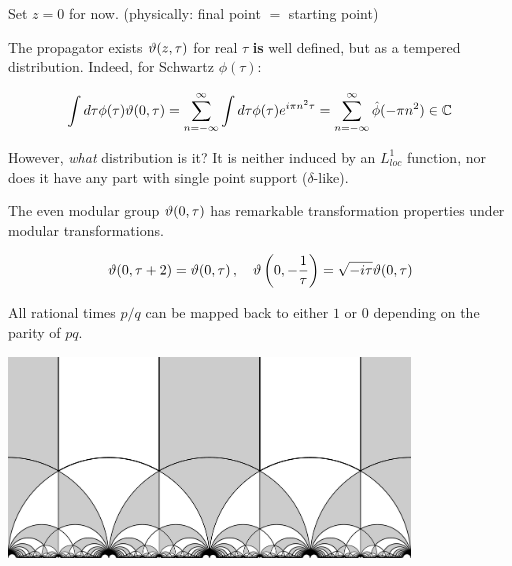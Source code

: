 \documentclass{beamer}
\begin{document}
\begin{frame}
    \begin{center}\Large Set $z=0$ for now.
    \vfill
    (physically: final point $=$ starting point)
\end{center}
\end{frame}

\begin{frame}{The propagator exists}
    $\vartheta(z,\tau)$ for real $\tau$ \textbf{is} well defined, but as a tempered distribution. Indeed, for Schwartz $\phi(\tau)$:

    \begin{equation}
        \int d\tau \phi(\tau) \vartheta(0,\tau) = \sum_{n=-\infty}^\infty \int d\tau \phi(\tau) e^{i\pi n^2 \tau} = \sum_{n=-\infty}^\infty \hat\phi(-\pi n^2) \in \mathbb{C}
        \label{}
    \end{equation}

    \vfill

    However, \emph{what} distribution is it? It is neither induced by an $L^1_{loc}$ function, nor does it have any part with single point support ($\delta$-like).
\end{frame}

\begin{frame}{The even modular group}
    $\vartheta(0,\tau)$ has remarkable transformation properties under modular transformations.

\begin{equation}
    \vartheta(0,\tau + 2) = \vartheta(0,\tau)\,,\quad \vartheta\left(0,-\frac{1}{\tau}\right) = \sqrt{-i\tau} \vartheta(0,\tau)
    \label{}
\end{equation}

All rational times $p/q$ can be mapped back to either $1$ or $0$ depending on the parity of $pq$.

\begin{center}\includegraphics[width=0.8\textwidth]{modulargroup}\end{center}

\end{frame}
\end{document}
